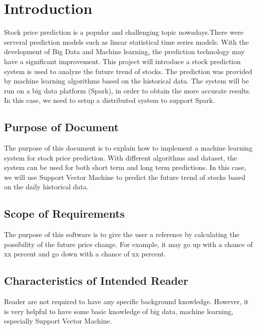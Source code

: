 \documentclass[12pt]{article}
\begin{document}
\section{Introduction}

Stock price prediction is a popular and challenging topic nowadays.There were
serveral  prediction models such as linear statistical time
series models. With the development of Big Data and Machine learning, the
prediction technology may have a significant improvement.  This project will
introduce a stock prediction system is used to analyze the future trend of
stocks. The prediction was provided by machine learning algorithms based on the
historical data.  The system will be run on a big data platform (Spark), in
order to obtain the more accurate results. In this case, we need to setup a
distributed system to support Spark.


\subsection{Purpose of Document}

The purpose of this document is to explain how to implement a machine learning
system for stock price prediction.  With different algorithms and dataset, the
system can be used for both short term and long term predictions.  In this case,
we will use Support Vector Machine to predict the future trend of stocks based
on the daily historical data.

\subsection{Scope of Requirements} 

The purpose of this software is to give the user a reference by calculating the
possibility of the future price change. For example, it may go up with a chance
of xx percent and go down with a chance of xx percent. 

\subsection{Characteristics of Intended Reader} 

Reader are not required to have any specific background knowledge. However, it
is very helpful to have some basic knowledge of big data, machine learning,
especially Support Vector Machine.   
\end{document}
